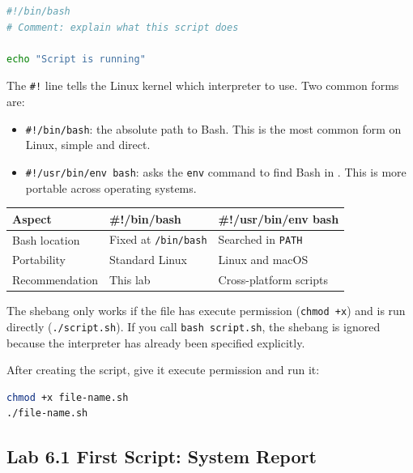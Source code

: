 \begin{lstlisting}[language=bash, caption={Basic structure of a Bash script}]
#!/bin/bash
# Comment: explain what this script does

echo "Script is running"
\end{lstlisting}

The \texttt{\#!} line tells the Linux kernel which interpreter to use. Two
common forms are:

\begin{itemize}
  \item \texttt{\#!/bin/bash}: the absolute path to Bash. This is the most
    common form on Linux, simple and direct.
  \item \texttt{\#!/usr/bin/env bash}: asks the \texttt{env} command to find
    Bash in . This is more portable across operating systems.
\end{itemize}

\begin{center}
\begin{tabular}{lll}
\hline
\textbf{Aspect} & \textbf{\#!/bin/bash} & \textbf{\#!/usr/bin/env bash} \\
\hline
Bash location & Fixed at \texttt{/bin/bash} & Searched in \texttt{PATH} \\
Portability & Standard Linux & Linux and macOS \\
Recommendation & This lab & Cross-platform scripts \\
\hline
\end{tabular}
\end{center}

\begin{notebox}
The shebang only works if the file has execute permission (\texttt{chmod +x})
and is run directly (\texttt{./script.sh}). If you call
\texttt{bash script.sh}, the shebang is ignored because the interpreter has
already been specified explicitly.
\end{notebox}

After creating the script, give it execute permission and run it:

\begin{lstlisting}[language=bash, caption={Granting permission and running a script}]
chmod +x file-name.sh
./file-name.sh
\end{lstlisting}

\subsection*{Lab 6.1 First Script: System Report}

